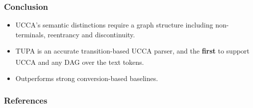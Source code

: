 \documentclass[t,xcolor={svgnames}]{beamer}
\newcommand{\parser}[1]{TUPA\textsubscript{#1}}
\begin{document}
\begin{frame}
\frametitle{Conclusion}
\begin{itemize}
 \item UCCA's semantic distinctions require a graph structure including {\color{blue}non-terminals}, {\color{orange}reentrancy} and {\color{red}discontinuity}.
 \item \parser{} is an accurate transition-based UCCA parser,
 	and the \textbf{first} to support UCCA and any DAG over the text tokens.
 \item Outperforms strong conversion-based baselines.
\end{itemize}

\end{frame}



\begin{frame}[allowframebreaks]
\frametitle{References}

\tiny
\end{frame}
\end{document}
